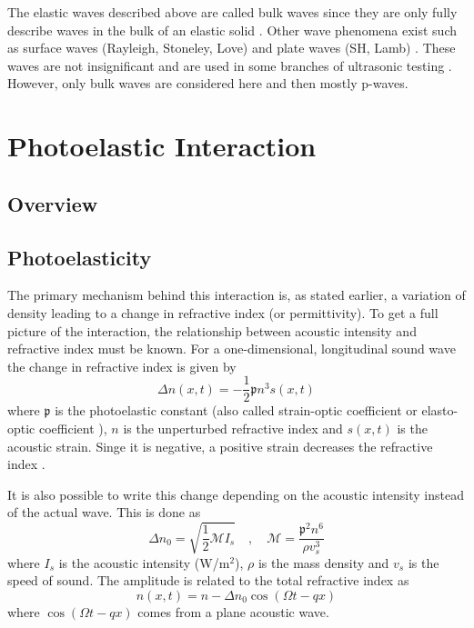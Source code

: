 \documentclass[10pt,a4paper]{eitExjobb}
\begin{document}
	The elastic waves described above are called bulk waves since they are only fully describe waves in the bulk of an elastic solid \cite{Kaufman2005}. Other wave phenomena exist such as surface waves (Rayleigh, Stoneley, Love) \cite{Kaufman2005} and plate waves (SH, Lamb) \cite{Schmerr2016}. These waves are not insignificant and are used in some branches of ultrasonic testing \cite{Schmerr2016}. However, only bulk waves are considered here and then mostly p-waves.
	
	
	\section{Photoelastic Interaction}
	
	\subsection{Overview}
	
	\subsection{Photoelasticity}
	The primary mechanism behind this interaction is, as stated earlier, a variation of density leading to a change in refractive index (or permittivity). To get a full picture of the interaction, the relationship between acoustic intensity and refractive index must be known. For a one-dimensional, longitudinal sound wave the change in refractive index is given by \cite{Saleh2007}
	\begin{equation*}
	\Delta n (x,t) = -\frac{1}{2} \mathfrak{p} n^3 s(x,t)
	\end{equation*}
	where $\mathfrak{p}$ is the photoelastic constant (also called strain-optic coefficient or elasto-optic coefficient \cite{Korpel1988}), $n$ is the unperturbed refractive index and $s(x,t)$ is the acoustic strain. Singe it is negative, a positive strain decreases the refractive index \cite{Saleh2007}.
	
	It is also possible to write this change depending on the acoustic intensity instead of the actual wave. This is done as \cite{Saleh2007}
	\begin{equation*}
	\Delta n_0 = \sqrt{\frac{1}{2} \mathcal{M} I_s} \quad , \quad
	\mathcal{M} = \frac{\mathfrak{p}^2 n^6}{\rho v_s^3}
	\end{equation*}
	where $I_s$ is the acoustic intensity (W/m$^2$), $\rho$ is the mass density and $v_s$ is the speed of sound. The amplitude is related to the total refractive index as \cite{Saleh2007}
	\begin{equation*}
	n(x,t) = n - \Delta n_0 \cos(\Omega t - qx)
	\end{equation*}
	where $\cos(\Omega t - qx)$ comes from a plane acoustic wave.
	
\end{document}
